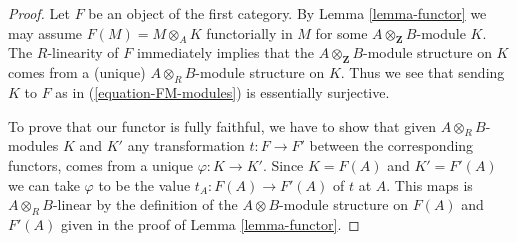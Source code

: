 \documentclass[10pt,a4paper]{amsart}
\theoremstyle{plain}
\theoremstyle{definition}
\theoremstyle{remark}
\numberwithin{equation}{subsection}
\begin{document}
\begin{proof}
Let $F$ be an object of the first category. By
Lemma \ref{lemma-functor} we may assume $F(M) = M \otimes_A K$
functorially in $M$ for some $A \otimes_\mathbf{Z} B$-module $K$.
The $R$-linearity of $F$ immediately implies that the
$A \otimes_\mathbf{Z} B$-module structure on $K$ comes
from a (unique) $A \otimes_R B$-module structure on $K$.
Thus we see that sending $K$ to $F$ as in (\ref{equation-FM-modules})
is essentially surjective.

\medskip\noindent
To prove that our functor is fully faithful, we have to show that
given $A \otimes_R B$-modules $K$ and $K'$ any transformation
$t : F \to F'$ between the corresponding functors, comes from
a unique $\varphi : K \to K'$. Since $K = F(A)$ and $K' = F'(A)$
we can take $\varphi$ to be the value $t_A : F(A) \to F'(A)$
of $t$ at $A$. This maps is $A \otimes_R B$-linear by the
definition of the $A \otimes B$-module structure on $F(A)$
and $F'(A)$ given in the proof of Lemma \ref{lemma-functor}.
\end{proof}
\end{document}
